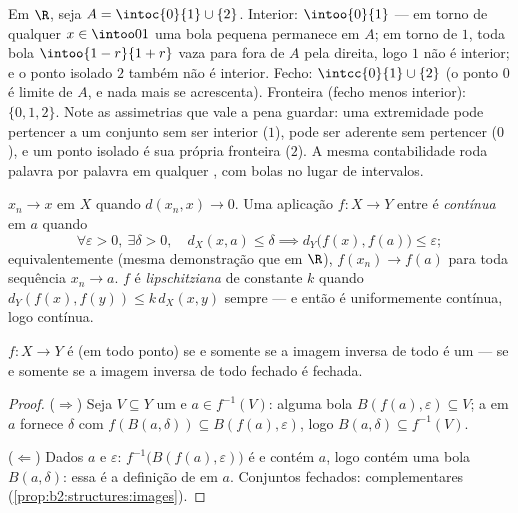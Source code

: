 \begin{example}\label{ex:b2:metric:intclosure}
Em $\R$, seja $A = \intoc{0}{1} \cup \{2\}$. Interior:
$\intoo{0}{1}$ --- em torno de qualquer $x \in \intoo01$ uma bola pequena
permanece em $A$; em torno de $1$, toda bola $\intoo{1-r}{1+r}$ vaza
para fora de $A$ pela direita, logo $1$ não é interior; e o
ponto isolado $2$ também não é interior. Fecho:
$\intcc{0}{1} \cup \{2\}$ (o ponto $0$ é limite de $A$,
e nada mais se acrescenta). Fronteira (fecho menos interior):
$\{0, 1, 2\}$. Note as assimetrias que vale a pena guardar: uma
extremidade pode pertencer a um conjunto sem ser interior ($1$), pode
ser aderente sem pertencer ($0$), e um ponto isolado é
sua própria fronteira ($2$). A mesma contabilidade roda palavra por palavra em
qualquer , com bolas no lugar de intervalos.
\end{example}

\begin{definition}\label{def:b2:metric:continuity}
$x_n \to x$ em $X$ quando $d(x_n, x) \to 0$. Uma aplicação $f \colon X \to Y$
entre  é \emph{contínua} em $a$ quando
\[
\forall \varepsilon > 0,\ \exists\delta > 0,\quad
d_X(x, a) \leq \delta \implies d_Y\bigl(f(x), f(a)\bigr) \leq
\varepsilon ;
\]
equivalentemente (mesma demonstração que em $\R$), $f(x_n) \to f(a)$ para toda
sequência $x_n \to a$. $f$ é \emph{lipschitziana} de constante $k$ quando
$d_Y(f(x), f(y)) \leq k\, d_X(x, y)$ sempre --- e então é uniformemente
contínua, logo contínua.
\end{definition}

\begin{theorem}\label{thm:b2:metric:globalcontinuity}
$f \colon X \to Y$ é  (em todo ponto) se e somente se a
imagem inversa de todo  é um  --- se e somente se a imagem inversa de todo
fechado é fechada.
\end{theorem}

\begin{proof}
($\Rightarrow$) Seja $V \subseteq Y$ um  e $a \in f^{-1}(V)$:
alguma bola $B(f(a), \varepsilon) \subseteq V$; a  em $a$
fornece $\delta$ com $f(B(a, \delta)) \subseteq B(f(a),
\varepsilon)$, logo $B(a, \delta) \subseteq f^{-1}(V)$.

($\Leftarrow$) Dados $a$ e $\varepsilon$: $f^{-1}\bigl(B(f(a),
\varepsilon)\bigr)$ é  e contém $a$, logo contém uma bola
$B(a, \delta)$: essa é a definição de  em $a$. Conjuntos
fechados: complementares (\cref{prop:b2:structures:images}).
\end{proof}

